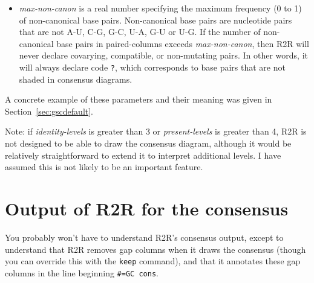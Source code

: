 \documentclass[letterpaper,12pt]{report}
\begin{document}
\begin{itemize}
\item {\it max-non-canon} is a real number specifying the maximum frequency (0 to 1) of non-canonical base pairs.  Non-canonical base pairs are nucleotide pairs that are not A-U, C-G, G-C, U-A, G-U or U-G.  If the number of non-canonical base pairs in paired-columns exceeds {\it max-non-canon}, then R2R will never declare covarying, compatible, or non-mutating pairs.  In other words, it will always declare code {\tt ?}, which corresponds to base pairs that are not shaded in consensus diagrams.
\end{itemize}

A concrete example of these parameters and their meaning was given in Section~\ref{sec:gscdefault}.

Note: if {\it identity-levels} is greater than 3 or {\it present-levels} is greater than 4, R2R is not designed to be able to draw the consensus diagram, although it would be relatively straightforward to extend it to interpret additional levels.  I have assumed this is not likely to be an important feature.

\section{Output of R2R for the consensus}
\label{sec:gscmarkup}

You probably won't have to understand R2R's consensus output, except to
understand that R2R removes gap columns when it
draws the consensus (though you can override this with the {\tt keep} command), and that it annotates 
these gap columns in the line beginning {\tt \#=GC cons}.
\end{document}

